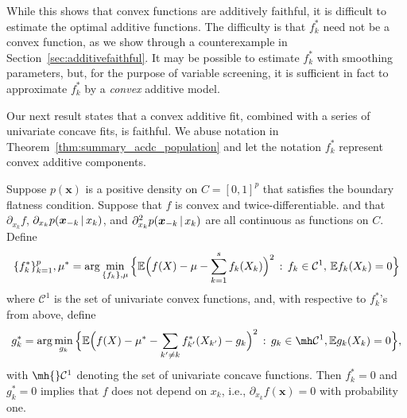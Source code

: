 While this shows that convex functions are additively faithful, it is difficult to
estimate the optimal additive functions.  The difficulty
is that $f^*_k$ need not be
a convex function, as we show through a counterexample
in Section~\ref{sec:additivefaithful}. It may be possible to estimate $f^*_k$ with smoothing parameters, but, for the purpose of variable screening, it is sufficient in fact to approximate $f^*_k$ by a \emph{convex} additive model. 

Our next result states that a convex additive fit, combined with a series of univariate concave fits, is faithful. We abuse notation in Theorem~\ref{thm:summary_acdc_population} and let the notation $f^*_k$ represent convex additive components.

\begin{stheorem}
\label{thm:summary_acdc_population}
Suppose $p(\mathbf{x})$ is a positive
density on $C=[0,1]^p$ that satisfies the boundary flatness
condition. Suppose that $f$ is convex and twice-differentiable.
and that $\partial_{x_k} f$, $\partial_{x_k} p( \mbox{\boldmath $x$}_{-k}
{\,|\,} x_k )$, and $\partial_{x_k}^2 p( \mbox{\boldmath $x$}_{-k} {\,|\,} x_k)$
are all continuous as functions on $C$.
Define
\begin{equation}
\{ f^*_k \}_{k=1}^p,\mu^* = \arg\min_{\{f_k\},\mu} \Big \{
{\mathbb E}\Bigl( f(X) - \mu - \sum_{k=1}^s f_k(X_k) \Bigr)^2 \,:\, f_k \in
\mathcal{C}^1, \, {\mathbb E} f_k(X_k) = 0 \Big \}
\end{equation} where $\mathcal{C}^1$ is the set of univariate convex
functions, and, with respective to $f^*_k$'s from above, define
\begin{equation}
g^*_k = \arg\min_{g_k} \Big\{ \E\Bigl( f(X) - \mu^* - 
\sum_{k' \neq k} f^*_{k'}(X_{k'}) - g_k \Bigr)^2 \,:\, g_k \in \mh
\mathcal{C}^1, \E g_k(X_k) = 0 \Big\},
\end{equation}
with $\mh{}\mathcal{C}^1$ denoting the set of univariate concave
functions.  Then $f^*_k = 0$ and $g^*_k = 0$ implies that $f$ does not
depend on $x_k$, i.e., $\partial_{x_k} f(\mathbf{x}) = 0$ with
probability one.
\end{stheorem}

